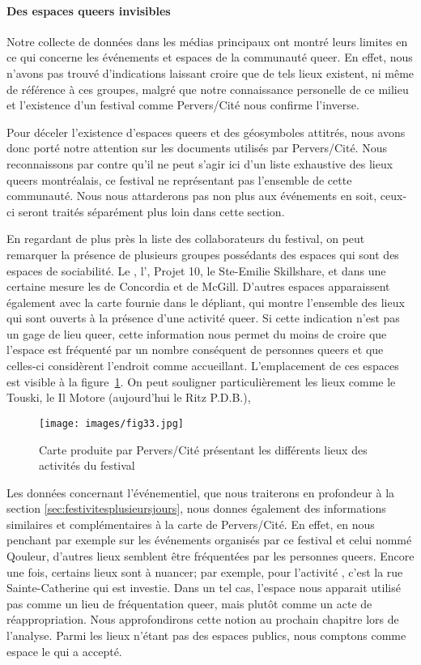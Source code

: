\paragraph{Des espaces queers  invisibles}
Notre collecte de données dans les médias principaux ont montré leurs limites en ce qui concerne les événements et espaces de la communauté queer.
En effet, nous n'avons pas trouvé d'indications laissant croire que de tels lieux existent, ni même de référence à ces groupes, malgré que notre connaissance personelle de ce milieu et l'existence d'un festival comme Pervers/Cité nous confirme l'inverse.

Pour déceler l'existence d'espaces queers et des géosymboles attitrés, nous avons donc porté notre attention sur les documents utilisés par Pervers/Cité.
Nous reconnaissons par contre qu'il ne peut s'agir ici d'un liste exhaustive des lieux queers montréalais, ce festival ne représentant pas l'ensemble de cette communauté.
Nous nous attarderons pas non plus aux événements en soit, ceux-ci seront traités séparément plus loin dans cette section.

En regardant de plus près la liste des collaborateurs du festival, on peut remarquer la présence de plusieurs groupes possédants des espaces qui sont  des espaces de sociabilité.
Le \alccva, l'\astteq, Projet 10, le Ste-Emilie Skillshare, et dans une certaine mesure les \grip de Concordia et de McGill.
D'autres espaces apparaissent également avec la carte fournie dans le dépliant, qui montre l'ensemble des lieux qui sont ouverts à la présence d'une activité queer.
Si cette indication n'est pas un gage de lieu queer, cette information nous permet du moins de croire que l'espace est fréquenté par un nombre conséquent de personnes queers et que celles-ci considèrent l'endroit comme accueillant.
L'emplacement de ces espaces est visible à la figure~\ref{fig:carte_perverscite}.
On peut souligner particulièrement les lieux comme le Touski, le Il Motore (aujourd'hui le Ritz P.D.B.),

\begin{figure}[ht]
	\centering
	\texttt{[image: images/fig33.jpg]}
	\caption{Carte produite par Pervers/Cité présentant les différents lieux des activités du festival}\label{fig:carte_perverscite}
\end{figure}

Les données concernant l'événementiel, que nous traiterons en profondeur à la section \ref{sec:festivitesplusieursjours}, nous donnes également des informations similaires et complémentaires à la carte de Pervers/Cité.
En effet, en nous penchant par exemple sur les événements organisés par ce festival et celui nommé Qouleur, d'autres lieux semblent être fréquentées par les personnes queers.
Encore une fois, certains lieux sont à nuancer; par exemple, pour l'activité , c'est la rue Sainte-Catherine qui est investie.
Dans un tel cas, l'espace nous apparait utilisé pas comme un lieu de fréquentation queer, mais plutôt comme un acte de réappropriation.
Nous approfondirons cette notion au prochain chapitre lors de l'analyse.
Parmi les lieux n'étant pas des espaces publics, nous comptons comme espace le \mai{} qui a accepté.

